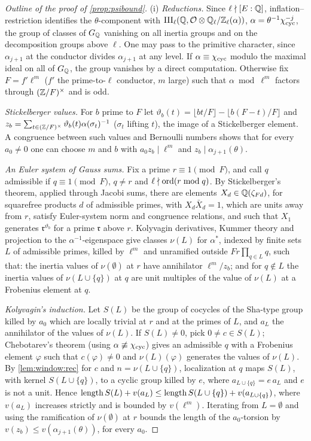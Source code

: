 \begin{proof}[Outline of the proof of \cref{prop:psibound}]
(i) \emph{Reductions.} Since $\ell\nmid[E:\mathbb{Q}]$, inflation--restriction identifies the $\theta$-component with
$\mathrm{III}_\ell(\mathbb{Q},\mathcal{O}\otimes\mathbb{Q}_\ell/\mathbb{Z}_\ell(\alpha))$, $\alpha=\theta^{-1}\chi_{\mathrm{cyc}}^{-j}$, the group of classes of $G_{\mathbb{Q}}$
vanishing on all inertia groups and on the decomposition groups above $\ell$. One may pass to the primitive
character, since $\alpha_{j+1}$ at the conductor divides $\alpha_{j+1}$ at any level. If $\alpha\equiv\chi_{\mathrm{cyc}}$
modulo the maximal ideal on all of $G_{\mathbb{Q}}$, the group vanishes by a direct computation. Otherwise fix
$F=f'\ell^m$ ($f'$ the prime-to-$\ell$ conductor, $m$ large) such that $\alpha\bmod\ell^m$ factors through
$(\mathbb{Z}/F)^\times$ and is odd.

\emph{Stickelberger values.} For $b$ prime to $F$ let $\vartheta_b(t)=\lfloor bt/F\rfloor-\lfloor b(F-t)/F\rfloor$
and $z_b=\sum_{t\in(\mathbb{Z}/F)^\times}\vartheta_b(t)\alpha(\sigma_t)^{-1}$ ($\sigma_t$ lifting $t$), the image of a
Stickelberger element. A congruence between such values and Bernoulli numbers shows that for every $a_0\ne0$ one
can choose $m$ and $b$ with $a_0z_b\mid\ell^m$ and $z_b\mid\alpha_{j+1}(\theta)$.

\emph{An Euler system of Gauss sums.} Fix a prime $r\equiv1\pmod F$, and call $q$ admissible if $q\equiv1\pmod F$,
$q\ne r$ and $\ell\nmid\operatorname{ord}(r\bmod q)$. By Stickelberger's theorem, applied through Jacobi sums, there are elements
$X_d\in\mathbb{Q}(\zeta_{Fd})$, for squarefree products $d$ of admissible primes, with $X_d\bar X_d=1$, which are units away
from $r$, satisfy Euler-system norm and congruence relations, and such that $X_1$ generates $\mathfrak r^{\vartheta_b}$
for a prime $\mathfrak r$ above $r$. Kolyvagin derivatives, Kummer theory and projection to the
$\alpha^{-1}$-eigenspace give classes $\nu(L)$
for $\alpha^*$, indexed by finite sets $L$ of admissible primes, killed by $\ell^m$ and unramified outside
$Fr\prod_{q\in L}q$, such that: the inertia values of $\nu(\emptyset)$ at $r$ have annihilator $\ell^m/z_b$; and for
$q\notin L$ the inertia values of $\nu(L\cup\{q\})$ at $q$ are unit multiples of the value of $\nu(L)$ at a
Frobenius element at $q$.

\emph{Kolyvagin's induction.} Let $S(L)$ be the group of cocycles of the Sha-type group killed by $a_0$ which are
locally trivial at $r$ and at the primes of $L$, and $a_L$ the annihilator of the values of $\nu(L)$. If
$S(L)\ne0$, pick $0\ne c\in S(L)$; Chebotarev's theorem (using $\alpha\not\equiv\chi_{\mathrm{cyc}}$) gives an admissible $q$
with a Frobenius element $\varphi$ such that $c(\varphi)\ne0$ and $\nu(L)(\varphi)$ generates the values of $\nu(L)$.
By \cref{lem:window:rec} for $c$ and $n=\nu(L\cup\{q\})$, localization at $q$ maps $S(L)$, with kernel
$S(L\cup\{q\})$, to a cyclic group killed by $e$, where $a_{L\cup\{q\}}=e\,a_L$ and $e$ is not a unit. Hence
$\operatorname{length} S(L)+v(a_L)\le\operatorname{length} S(L\cup\{q\})+v(a_{L\cup\{q\}})$, where $v(a_L)$ increases strictly and is bounded by
$v(\ell^m)$. Iterating from $L=\emptyset$ and using the ramification of $\nu(\emptyset)$ at $r$ bounds the length of
the $a_0$-torsion by $v(z_b)\le v(\alpha_{j+1}(\theta))$, for every $a_0$.


\end{proof}
